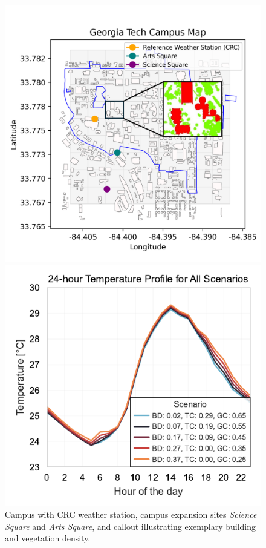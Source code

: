 \documentclass[a4paper, 12pt]{article}
\begin{document}
\begin{figure}[tbhp]
    \centering
    \begin{minipage}[b]{0.49\textwidth}
        \centering
        \includegraphics[width=\textwidth, trim = 0.45cm 0.80cm 0.40cm 2.7cm, clip = true]{georgia_tech_map_with_tiles.pdf}
        \caption{Campus with CRC weather station, campus expansion sites \textit{Science Square} and \textit{Arts Square}, and callout illustrating exemplary building and vegetation density.}
        \label{fig:campus-map}
    \end{minipage}
    \hfill
    \begin{minipage}[b]{0.49\textwidth}
        \centering
        \includegraphics[width=1\textwidth, trim = 0.1cm 0.1cm 0.1cm 0.68cm, clip = true]{Diurnal_Hottest_Month_July.pdf}

\end{minipage}
\end{figure}
\end{document}
